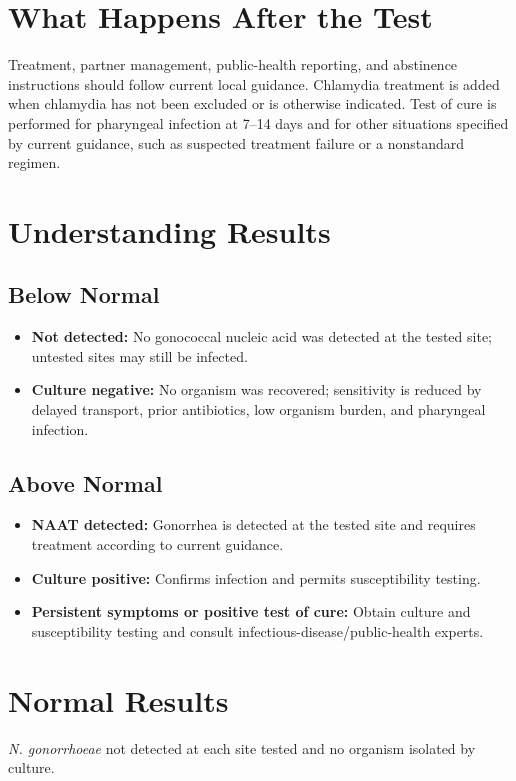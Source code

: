 \section*{What Happens After the Test}
Treatment, partner management, public-health reporting, and abstinence instructions should follow current local guidance. Chlamydia treatment is added when chlamydia has not been excluded or is otherwise indicated. Test of cure is performed for pharyngeal infection at 7--14 days and for other situations specified by current guidance, such as suspected treatment failure or a nonstandard regimen.

\section*{Understanding Results}
\subsection*{Below Normal}
\begin{itemize}
  \item \textbf{Not detected:} No gonococcal nucleic acid was detected at the tested site; untested sites may still be infected.
  \item \textbf{Culture negative:} No organism was recovered; sensitivity is reduced by delayed transport, prior antibiotics, low organism burden, and pharyngeal infection.
\end{itemize}

\subsection*{Above Normal}
\begin{itemize}
  \item \textbf{NAAT detected:} Gonorrhea is detected at the tested site and requires treatment according to current guidance.
  \item \textbf{Culture positive:} Confirms infection and permits susceptibility testing.
  \item \textbf{Persistent symptoms or positive test of cure:} Obtain culture and susceptibility testing and consult infectious-disease/public-health experts.
\end{itemize}

\section*{Normal Results}
\textit{N. gonorrhoeae} not detected at each site tested and no organism isolated by culture.

